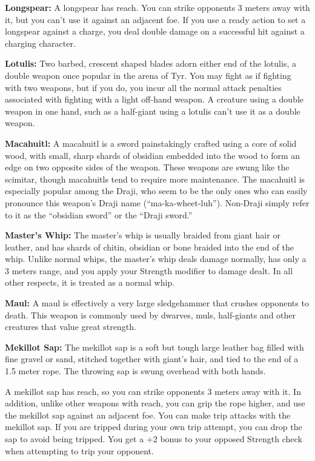 \textbf{Longspear:} A longspear has reach. You can strike opponents 3 meters away with it, but you can't use it against an adjacent foe. If you use a ready action to set a longspear against a charge, you deal double damage on a successful hit against a charging character. 

\textbf{Lotulis:} Two barbed, crescent shaped blades adorn either end of the lotulis, a double weapon once popular in the arena of Tyr. You may fight as if fighting with two weapons, but if you do, you incur all the normal attack penalties associated with fighting with a light off-hand weapon. A creature using a double weapon in one hand, such as a half-giant using a lotulis can't use it as a double weapon.

\textbf{Macahuitl:} A macahuitl is a sword painstakingly crafted using a core of solid wood, with small, sharp shards of obsidian embedded into the wood to form an edge on two opposite sides of the weapon. These weapons are swung like the scimitar, though macahuitls tend to require more maintenance. The macahuitl is especially popular among the Draji, who seem to be the only ones who can easily pronounce this weapon's Draji name (``ma-ka-wheet-luh''). Non-Draji simply refer to it as the ``obsidian sword'' or the ``Draji sword.''

\textbf{Master's Whip:} The master's whip is usually braided from giant hair or leather, and has shards of chitin, obsidian or bone braided into the end of the whip. Unlike normal whips, the master's whip deals damage normally, has only a 3 meters range, and you apply your Strength modifier to damage dealt. In all other respects, it is treated as a normal whip.

\textbf{Maul:} A maul is effectively a very large sledgehammer that crushes opponents to death. This weapon is commonly used by dwarves, muls, half-giants and other creatures that value great strength.

\textbf{Mekillot Sap:} The mekillot sap is a soft but tough large leather bag filled with fine gravel or sand, stitched together with giant's hair, and tied to the end of a 1.5 meter rope. The throwing sap is swung overhead with both hands.

A mekillot sap has reach, so you can strike opponents 3 meters away with it. In addition, unlike other weapons with reach, you can grip the rope higher, and use the mekillot sap against an adjacent foe. You can make trip attacks with the mekillot sap. If you are tripped during your own trip attempt, you can drop the sap to avoid being tripped. You get a +2 bonus to your opposed Strength check when attempting to trip your opponent.

